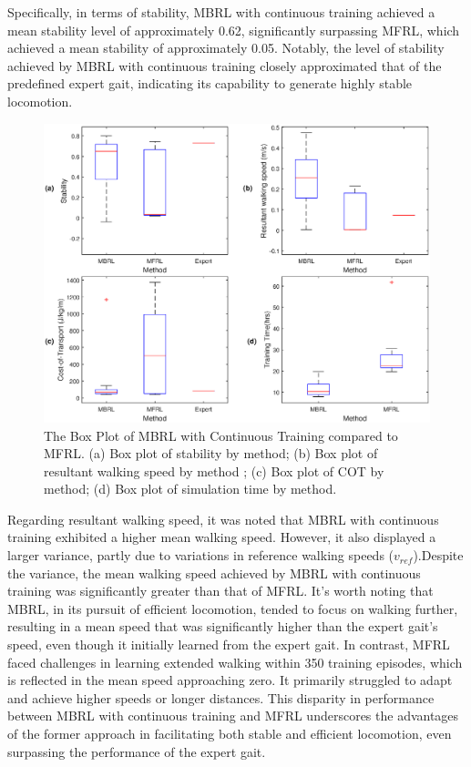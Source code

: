 Specifically, in terms of stability, MBRL with continuous training achieved a mean stability level of approximately 0.62, significantly surpassing MFRL, which achieved a mean stability of approximately 0.05. Notably, the level of stability achieved by MBRL with continuous training closely approximated that of the predefined expert gait, indicating its capability to generate highly stable locomotion. 
\begin{figure}[htb]
    \centering
    \includegraphics[width=\linewidth]{img/chap5/box_results.eps}
    \caption{The Box Plot of MBRL with Continuous Training compared to MFRL. (a) Box plot of stability by method; (b) Box plot of resultant walking speed by method ; (c) Box plot of COT by method; (d) Box plot of simulation time by method.}
    \label{fig:box}
\end{figure}

Regarding resultant walking speed, it was noted that MBRL with continuous training exhibited a higher mean walking speed. However, it also displayed a larger variance, partly due to variations in reference walking speeds ($v_{ref}$).Despite the variance, the mean walking speed achieved by MBRL with continuous training was significantly greater than that of MFRL. It's worth noting that MBRL, in its pursuit of efficient locomotion, tended to focus on walking further, resulting in a mean speed that was significantly higher than the expert gait's speed, even though it initially learned from the expert gait. In contrast, MFRL faced challenges in learning extended walking within 350 training episodes, which is reflected in the mean speed approaching zero. It primarily struggled to adapt and achieve higher speeds or longer distances. This disparity in performance between MBRL with continuous training and MFRL underscores the advantages of the former approach in facilitating both stable and efficient locomotion, even surpassing the performance of the expert gait. 

